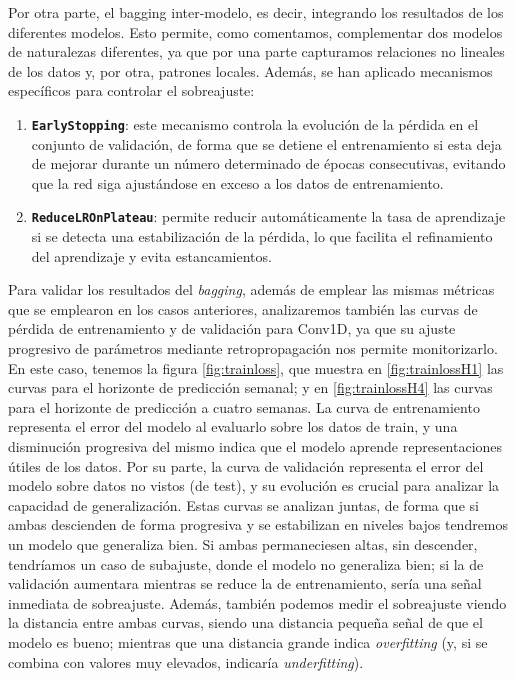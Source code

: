 \documentclass[a4paper,onecolumn]{extarticle}
\begin{document}
\begin{sloppypar}
Por otra parte, el bagging inter-modelo, es decir, integrando los resultados de los diferentes modelos. Esto permite, como comentamos, complementar dos modelos de naturalezas diferentes,
ya que por una parte capturamos relaciones no lineales de los datos y, por otra, patrones locales. Además, se han aplicado mecanismos específicos para controlar el sobreajuste:
\begin{enumerate}
    \item \textbf{\texttt{EarlyStopping}}: este mecanismo controla la evolución de la pérdida en el conjunto de validación, de forma que se detiene el entrenamiento si esta deja de 
    mejorar durante un número determinado de épocas consecutivas, evitando que la red siga ajustándose en exceso a los datos de entrenamiento.
    \item \textbf{\texttt{ReduceLROnPlateau}}: permite reducir automáticamente la tasa de aprendizaje si se detecta una estabilización de la pérdida, lo que facilita el refinamiento 
    del aprendizaje y evita estancamientos.
\end{enumerate}

Para validar los resultados del \textit{bagging}, además de emplear las mismas métricas que se emplearon en los casos anteriores, analizaremos también las curvas de pérdida 
de entrenamiento y de validación para Conv1D, ya que su ajuste progresivo de parámetros mediante retropropagación nos permite monitorizarlo. En este caso, tenemos la figura 
\ref{fig:trainloss}, que muestra en \ref{fig:trainlossH1} las curvas para el horizonte de predicción semanal; y en \ref{fig:trainlossH4} las curvas para el horizonte de predicción 
a cuatro semanas. La curva de entrenamiento representa el error del modelo al evaluarlo sobre los datos de train, y una disminución progresiva del mismo indica que el modelo aprende
representaciones útiles de los datos. Por su parte, la curva de validación representa el error del modelo sobre datos no vistos (de test), y su evolución es crucial para analizar la 
capacidad de generalización. Estas curvas se analizan juntas, de forma que si ambas descienden de forma progresiva y se estabilizan en niveles bajos tendremos un modelo que generaliza 
bien. Si ambas permaneciesen altas, sin descender, tendríamos un caso de subajuste, donde el modelo no generaliza bien; si la de validación aumentara mientras se reduce la de entrenamiento, 
sería una señal inmediata de sobreajuste. Además, también podemos medir el sobreajuste viendo la distancia entre ambas curvas, siendo una distancia pequeña señal de que el modelo es bueno; 
mientras que una distancia grande indica \textit{overfitting} (y, si se combina con valores muy elevados, indicaría \textit{underfitting}).


\end{sloppypar}
\end{document}
